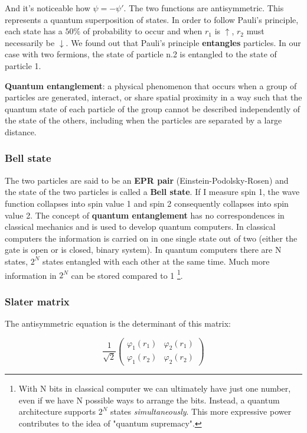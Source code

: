 		And it's noticeable how $\psi = -\psi'$.
		The two functions are antisymmetric.
		This represents a quantum superposition of states.
		In order to follow Pauli's principle, each state has a $50\%$ of probability to occur and when $r_1$ is $\uparrow$,  $r_2$ must necessarily be $\downarrow$.
		We found out that Pauli's principle \textbf{entangles} particles.
		In our case with two fermions, the state of particle n.2 is entangled to the state of particle 1.

		\begin{center}
		\textbf{Quantum entanglement}: a physical phenomenon that occurs when a group of particles are generated, interact, or share spatial proximity in a way such that the quantum state of each particle of the group cannot be described independently of the state of the others, including when the particles are separated by a large distance.
		\end{center}

		\subsubsection{Bell state}
		The two particles are said to be an \textbf{EPR pair} (Einstein-Podolsky-Rosen) and the state of the two particles is called a \textbf{Bell state}.
		If I measure spin 1, the wave function collapses into spin value 1 and spin 2 consequently collapses into spin value 2.
		The concept of \textbf{quantum entanglement} has no correspondences in classical mechanics and is used to develop quantum computers.
		In classical computers the information is carried on in one single state out of two (either the gate is open or is closed, binary system).
	In quantum computers there are N states, $2^N$ states entangled with each other at the same time.
	Much more information in $2^N$ can be stored compared to 1 \footnote{With N bits in classical computer we can ultimately have just one number, even if we have N possible ways to arrange the bits.
																																		Instead, a quantum architecture supports $2^N$ states \textit{simultaneously}.
																																		This more expressive power contributes to the idea of "quantum supremacy".}.

		\subsubsection{Slater matrix}
		The antisymmetric equation is the determinant of this matrix:

		$$\frac{1}{\sqrt{2}}\begin{pmatrix}\varphi_1(r_1)&\varphi_2(r_1)\\\varphi_1(r_2)&\varphi_2(r_2)\end{pmatrix}$$

